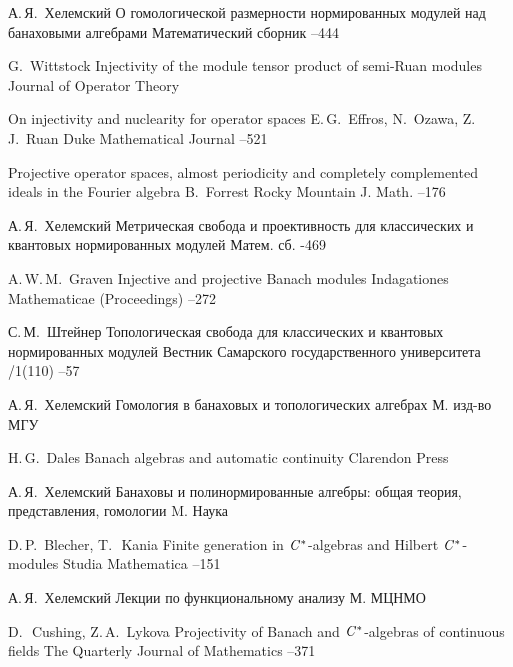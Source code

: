 \documentclass[12pt]{article}
\numberwithin{equation}{subsection}
\theoremstyle{plain}
\begin{document}
\begin{thebibliography}{99}

\by А.\,Я.~Хелемский
\paper О гомологической размерности нормированных модулей над банаховыми алгебрами
\jour Математический сборник
--444

\by G.~Wittstock
\paper Injectivity of the module tensor product of semi-Ruan modules
\jour Journal of Operator Theory

\paper On injectivity and nuclearity for operator spaces
\by E.\,G.~Effros, N.~Ozawa, Z.\,J.~Ruan
\jour Duke Mathematical Journal
--521

\paper Projective operator spaces, almost periodicity and completely complemented ideals in the Fourier algebra
\by B.~Forrest
\jour Rocky Mountain J. Math.
--176

\by А.\,Я.~Хелемский
\paper Метрическая свобода и проективность для классических и квантовых нормированных модулей
\jour Матем. сб.
-469

\by A.\,W.\,M.~Graven
\paper Injective and projective Banach modules
\jour Indagationes Mathematicae (Proceedings)
--272

\by С.\,М.~Штейнер
\paper Топологическая свобода для классических и квантовых нормированных модулей
\jour Вестник Самарского государственного университета
/1(110)
--57


\by А.\,Я.~Хелемский
\book Гомология в банаховых и топологических алгебрах
\publaddr М.
\publ изд-во МГУ

\by H.\,G.~Dales
\book Banach algebras and automatic continuity
\publ Clarendon Press

\by А.\,Я.~Хелемский
\book Банаховы и полинормированные алгебры: общая теория, представления, гомологии
\publaddr M.
\publ Наука

\by D.\,P.~Blecher, T.\,~Kania
\paper Finite generation in $\it{C^*}$-algebras and Hilbert $\it{C^*}$-modules
\jour Studia Mathematica
--151

\by А.\,Я.~Хелемский
\book Лекции по функциональному анализу
\publaddr М.
\publ МЦНМО


\by D.\,~Cushing, Z.\,A.~Lykova
\paper Projectivity of Banach and $\it{C^*}$-algebras of continuous fields
\jour The Quarterly Journal of Mathematics
--371

\end{thebibliography}
\end{document}
